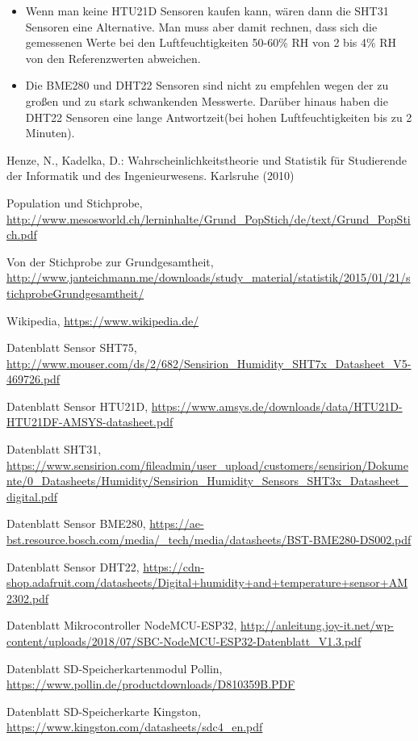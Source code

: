 \documentclass[runningheads]{llncs}
\begin{document}
\begin{itemize}
\item Wenn man keine HTU21D Sensoren kaufen kann, wären dann die SHT31 Sensoren eine Alternative. Man muss aber damit rechnen, dass sich die gemessenen Werte bei den Luftfeuchtigkeiten 50-60\% RH von 2 bis 4\% RH von den Referenzwerten abweichen.
\end{itemize}
\begin{itemize}
\item Die BME280 und DHT22 Sensoren sind nicht zu empfehlen wegen der zu großen und zu stark schwankenden Messwerte. Darüber hinaus haben die DHT22 Sensoren eine lange Antwortzeit(bei hohen Luftfeuchtigkeiten bis zu 2 Minuten).
\end{itemize}

\begin{thebibliography}{}

Henze, N., Kadelka, D.: Wahrscheinlichkeitstheorie und Statistik für Studierende der Informatik und des Ingenieurwesens. Karlsruhe (2010)

Population und Stichprobe, \url{http://www.mesosworld.ch/lerninhalte/Grund_PopStich/de/text/Grund_PopStich.pdf}

Von der Stichprobe zur Grundgesamtheit, \url{http://www.janteichmann.me/downloads/study_material/statistik/2015/01/21/stichprobeGrundgesamtheit/}

Wikipedia, \url{https://www.wikipedia.de/}


Datenblatt Sensor SHT75, \url{http://www.mouser.com/ds/2/682/Sensirion_Humidity_SHT7x_Datasheet_V5-469726.pdf}

Datenblatt Sensor HTU21D, \url{https://www.amsys.de/downloads/data/HTU21D-HTU21DF-AMSYS-datasheet.pdf}

Datenblatt SHT31, \url{https://www.sensirion.com/fileadmin/user_upload/customers/sensirion/Dokumente/0_Datasheets/Humidity/Sensirion_Humidity_Sensors_SHT3x_Datasheet_digital.pdf}

Datenblatt Sensor BME280, \url{https://ae-bst.resource.bosch.com/media/_tech/media/datasheets/BST-BME280-DS002.pdf}

Datenblatt Sensor DHT22, \url{https://cdn-shop.adafruit.com/datasheets/Digital+humidity+and+temperature+sensor+AM2302.pdf}

Datenblatt Mikrocontroller NodeMCU-ESP32, \url{http://anleitung.joy-it.net/wp-content/uploads/2018/07/SBC-NodeMCU-ESP32-Datenblatt_V1.3.pdf}

Datenblatt SD-Speicherkartenmodul Pollin, \url{https://www.pollin.de/productdownloads/D810359B.PDF}

Datenblatt SD-Speicherkarte Kingston, \url{https://www.kingston.com/datasheets/sdc4_en.pdf}

\end{thebibliography}
\end{document}
